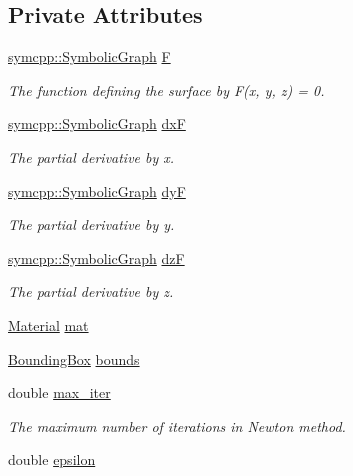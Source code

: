 \subsection*{Private Attributes}
\begin{DoxyCompactItemize}
\item 
\hyperlink{classsymcpp_1_1SymbolicGraph}{symcpp\+::\+Symbolic\+Graph} \hyperlink{classImplicitSurface_aeeafee33bf827627323373167ce841eb}{F}
\begin{DoxyCompactList}\small\item\em The function defining the surface by F(x, y, z) = 0. \end{DoxyCompactList}\item 
\hyperlink{classsymcpp_1_1SymbolicGraph}{symcpp\+::\+Symbolic\+Graph} \hyperlink{classImplicitSurface_a9861b92609a363bf78d73347a9272b5d}{dxF}
\begin{DoxyCompactList}\small\item\em The partial derivative by x. \end{DoxyCompactList}\item 
\hyperlink{classsymcpp_1_1SymbolicGraph}{symcpp\+::\+Symbolic\+Graph} \hyperlink{classImplicitSurface_a49145c0375f0adc02157b9368e733aa2}{dyF}
\begin{DoxyCompactList}\small\item\em The partial derivative by y. \end{DoxyCompactList}\item 
\hyperlink{classsymcpp_1_1SymbolicGraph}{symcpp\+::\+Symbolic\+Graph} \hyperlink{classImplicitSurface_aab31834ea321e276bb85348d7a7464f2}{dzF}
\begin{DoxyCompactList}\small\item\em The partial derivative by z. \end{DoxyCompactList}\item 
\hyperlink{classMaterial}{Material} \hyperlink{classImplicitSurface_adbb94dbb4d3271d5ed18752dde4aac32}{mat}
\item 
\hyperlink{classBoundingBox}{Bounding\+Box} \hyperlink{classImplicitSurface_a1332a4975d57ce5f91450221541df82a}{bounds}
\item 
double \hyperlink{classImplicitSurface_ad92c06925b2496b7fe3a1d2659a87075}{max\+\_\+iter}
\begin{DoxyCompactList}\small\item\em The maximum number of iterations in Newton method. \end{DoxyCompactList}\item 
double \hyperlink{classImplicitSurface_aa870a11380d4bc4c019d9d250e7ccc9c}{epsilon}
\end{DoxyCompactItemize}


